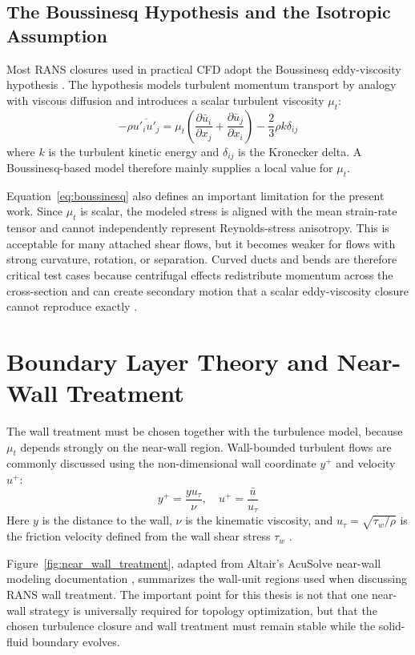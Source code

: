 \subsection{The Boussinesq Hypothesis and the Isotropic Assumption}
Most RANS closures used in practical CFD adopt the Boussinesq eddy-viscosity hypothesis \cite{Pope2000}. The hypothesis models turbulent momentum transport by analogy with viscous diffusion and introduces a scalar turbulent viscosity $\mu_t$:
\begin{equation}
	-\rho \overline{u'_i u'_j} = \mu_t \left( \frac{\partial \bar{u}_i}{\partial x_j} + \frac{\partial \bar{u}_j}{\partial x_i} \right) - \frac{2}{3} \rho k \delta_{ij}
	\label{eq:boussinesq}
\end{equation}
where $k$ is the turbulent kinetic energy and $\delta_{ij}$ is the Kronecker delta. A Boussinesq-based model therefore mainly supplies a local value for $\mu_t$.

Equation~\ref{eq:boussinesq} also defines an important limitation for the present work. Since $\mu_t$ is scalar, the modeled stress is aligned with the mean strain-rate tensor and cannot independently represent Reynolds-stress anisotropy. This is acceptable for many attached shear flows, but it becomes weaker for flows with strong curvature, rotation, or separation. Curved ducts and bends are therefore critical test cases because centrifugal effects redistribute momentum across the cross-section and can create secondary motion that a scalar eddy-viscosity closure cannot reproduce exactly \cite{Rumsey2000,Rumsey2001}.

\section{Boundary Layer Theory and Near-Wall Treatment}
The wall treatment must be chosen together with the turbulence model, because $\mu_t$ depends strongly on the near-wall region. Wall-bounded turbulent flows are commonly discussed using the non-dimensional wall coordinate $y^+$ and velocity $u^+$:
\begin{equation}
	y^+ = \frac{y u_\tau}{\nu}, \quad u^+ = \frac{\bar{u}}{u_\tau}
\end{equation}
Here $y$ is the distance to the wall, $\nu$ is the kinematic viscosity, and $u_\tau=\sqrt{\tau_w/\rho}$ is the friction velocity defined from the wall shear stress $\tau_w$ \cite{Pope2000}.

Figure~\ref{fig:near_wall_treatment}, adapted from Altair's AcuSolve near-wall modeling documentation \cite{AltairNearWall2024}, summarizes the wall-unit regions used when discussing RANS wall treatment. The important point for this thesis is not that one near-wall strategy is universally required for topology optimization, but that the chosen turbulence closure and wall treatment must remain stable while the solid-fluid boundary evolves.

